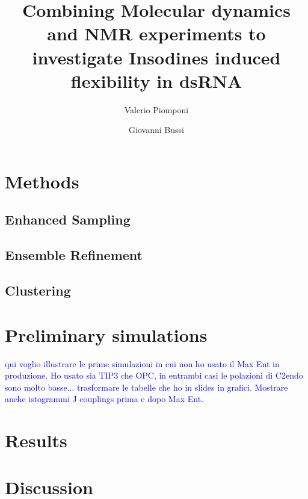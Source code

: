 \documentclass[runningheads,a4paper]{llncs}
\newcommand{\vp}{\textcolor{blue} }
\begin{document}


\title{Combining Molecular dynamics and NMR experiments to investigate Insodines induced flexibility in dsRNA}

\author{Valerio Piomponi \and Giovanni Bussi}
\maketitle

\section{Methods}
\subsection{Enhanced Sampling}
\subsection{Ensemble Refinement}
\subsection{Clustering}
\section{Preliminary simulations}
\vp{qui voglio illustrare le prime simulazioni in cui non ho usato il Max Ent in produzione. Ho usato sia TIP3 che OPC, in entrambi casi le polazioni di C2endo sono molto basse... trasformare le tabelle che ho in slides in grafici. Mostrare anche istogrammi J couplings prima e dopo Max Ent.} 
\section{Results}
\section{Discussion}
\end{document}
